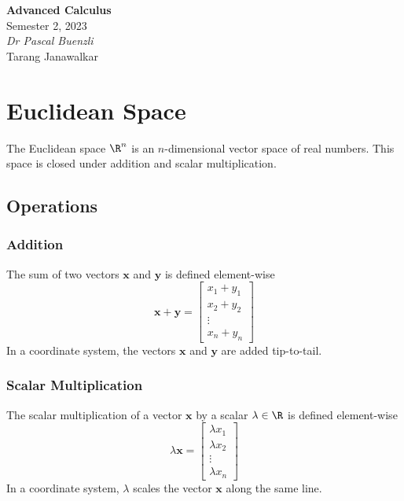 \documentclass{article}
\date{}
\newcommand{\unitName}{Advanced Calculus}
\newcommand{\unitTime}{Semester 2, 2023}
\newcommand{\unitCoordinator}{Dr Pascal Buenzli}
\newcommand{\documentAuthors}{Tarang Janawalkar}
\begin{document}
%
\begin{titlepage}
    \vspace*{\fill}
    \begin{center}
        \LARGE{\textbf{\unitName}} \\[0.1in]
        \normalsize{\unitTime} \\[0.2in]
        \normalsize\textit{\unitCoordinator} \\[0.2in]
        \documentAuthors
    \end{center}
    \vspace*{\fill}
    \doclicenseThis
    \thispagestyle{empty}
\end{titlepage}
\newpage
%
\tableofcontents
\newpage
%
\section{Euclidean Space}
The Euclidean space \(\R^n\) is an \(n\)-dimensional vector space of real numbers.
This space is closed under addition and scalar multiplication.
\subsection{Operations}
\subsubsection{Addition}
The sum of two vectors \(\symbf{x}\) and \(\symbf{y}\) is defined element-wise
\begin{equation*}
    \symbf{x} + \symbf{y} = \begin{bmatrix}
        x_1 + y_1 \\
        x_2 + y_2 \\
        \vdots    \\
        x_n + y_n
    \end{bmatrix}
\end{equation*}
In a coordinate system, the vectors \(\symbf{x}\) and \(\symbf{y}\) are added tip-to-tail.
\subsubsection{Scalar Multiplication}
The scalar multiplication of a vector \(\symbf{x}\) by a scalar \(\lambda \in \R\) is defined element-wise
\begin{equation*}
    \lambda \symbf{x} = \begin{bmatrix}
        \lambda x_1 \\
        \lambda x_2 \\
        \vdots      \\
        \lambda x_n
    \end{bmatrix}
\end{equation*}
In a coordinate system, \(\lambda\) scales the vector \(\symbf{x}\) along the same line.
\end{document}
